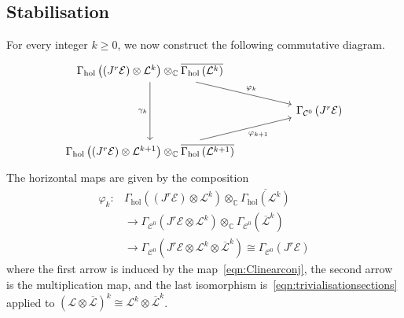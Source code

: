 \documentclass[a4paper]{amsart}
\newcommand{\bC}{\mathbb C}
\newcommand{\cE}{\mathcal E}
\newcommand{\cC}{\mathcal C}
\newcommand{\cL}{\mathcal L}
\newcommand{\lra}{\longrightarrow}
\theoremstyle{plain}
\theoremstyle{definition}
\newcommand{\Gammahol}{\Gamma_{\mathrm{hol}}}
\begin{document}
\subsection{Stabilisation}

For every integer $k \geq 0$, we now construct the following commutative diagram.
\begin{equation}\label{eqn:stabilisationdiagram}
\begin{tikzcd}
\Gammahol\left( (J^r\cE) \otimes \cL^k \right) \otimes_\bC \overline{\Gammahol\left(\cL^k \right)} \arrow[rrd, "\varphi_k"] \arrow[dd, "\gamma_k"'] &  &                                          \\
&  & \Gamma_{\cC^0}\left( J^r\cE \right) \\
\Gammahol\left( (J^r\cE) \otimes \cL^{k+1} \right) \otimes_\bC \overline{\Gammahol\left(\cL^{k+1} \right)} \arrow[rru, "\varphi_{k+1}"']                &  &                                         
\end{tikzcd}
\end{equation}
The horizontal maps are given by the composition
\begin{equation}\label{eqn:phikmap}
\begin{split}
    \varphi_k \colon& \Gammahol\left( (J^r\cE) \otimes \cL^k \right) \otimes_\bC \overline{\Gammahol\left(\cL^k \right)} \\
        &\lra \Gamma_{\cC^0}\left( J^r\cE \otimes \cL^k \right) \otimes_\bC \Gamma_{\cC^0}\left( \overline{\cL}^k \right) \\
        &\lra \Gamma_{\cC^0} \left(J^r\cE \otimes \cL^k \otimes \overline{\cL}^k \right) \cong \Gamma_{\cC^0}\left(J^r\cE \right)
\end{split}
\end{equation}
where the first arrow is induced by the map~\eqref{eqn:Clinearconj}, the second arrow is the multiplication map, and the last isomorphism is~\eqref{eqn:trivialisationsections} applied to $\left( \cL \otimes \overline{\cL} \right)^k \cong \cL^k \otimes \overline{\cL}^k$.
\end{document}

